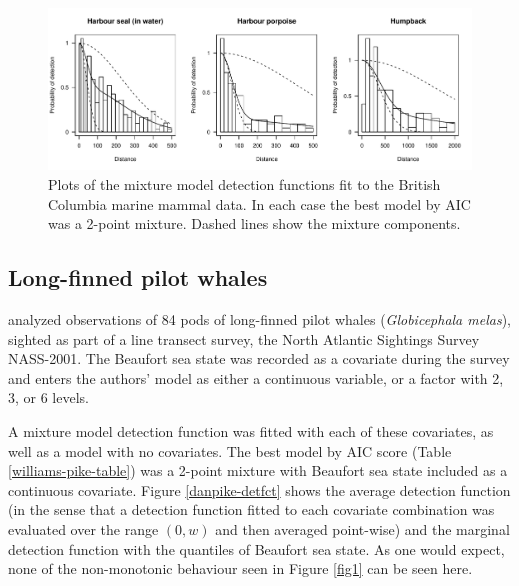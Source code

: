 \documentclass[useAMS,referee,usenatbib]{biom}
\begin{document}
\begin{figure}
\centering
\includegraphics[width=\textwidth]{analyses/williamsplots.pdf}
\caption{Plots of the mixture model detection functions fit to the British Columbia marine mammal data. In each case the best model by AIC was a 2-point mixture. Dashed lines show the mixture components.}
\label{williams-detfcts}
\end{figure}

\subsection{Long-finned pilot whales}

\cite{Pike:2003ug} analyzed observations of 84 pods of long-finned pilot whales (\textit{Globicephala melas}), sighted as part of a line transect survey, the North Atlantic Sightings Survey NASS-2001. The Beaufort sea state was recorded as a covariate during the survey and enters the authors' model as either a continuous variable, or a factor with 2, 3, or 6 levels.

A mixture model detection function was fitted with each of these covariates, as well as a model with no covariates.  The best model by AIC score (Table \ref{williams-pike-table}) was a 2-point mixture with Beaufort sea state included as a continuous covariate. Figure \ref{danpike-detfct} shows the average detection function (in the sense that a detection function fitted to each covariate combination was evaluated over the range $(0,w)$ and then averaged point-wise) and the marginal detection function with the quantiles of Beaufort sea state. As one would expect, none of the non-monotonic behaviour seen in Figure \ref{fig1} can be seen here.
\end{document}
